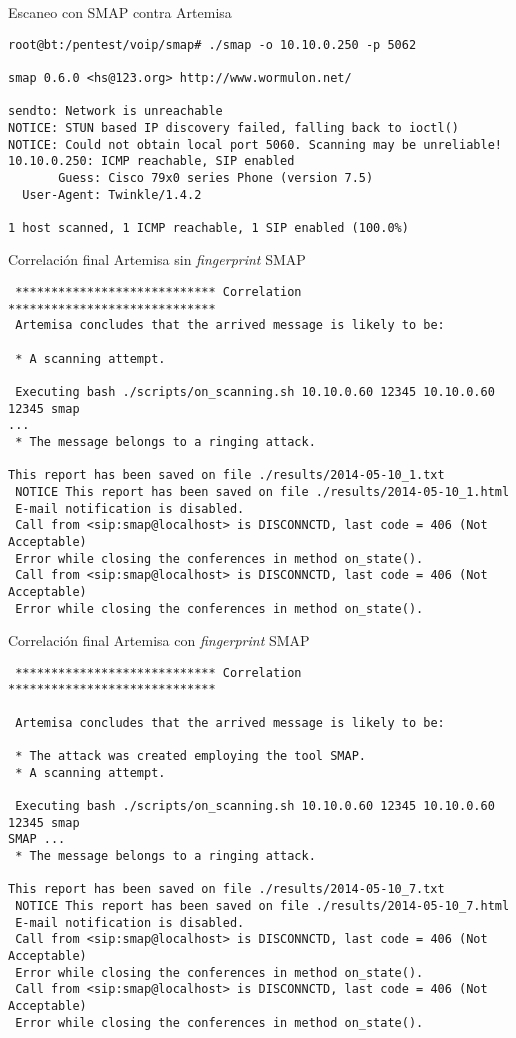 \documentclass[a4paper,12pt]{report}
\newenvironment{myscriptlisting}
{\begin{list}{}{\setlength{\leftmargin}{1em}}\item\scriptsize\bfseries}
{\end{list}}
\begin{document}
Escaneo con SMAP contra Artemisa
\begin{myscriptlisting}   
  \begin{verbatim}
root@bt:/pentest/voip/smap# ./smap -o 10.10.0.250 -p 5062

smap 0.6.0 <hs@123.org> http://www.wormulon.net/

sendto: Network is unreachable
NOTICE: STUN based IP discovery failed, falling back to ioctl()
NOTICE: Could not obtain local port 5060. Scanning may be unreliable!
10.10.0.250: ICMP reachable, SIP enabled
       Guess: Cisco 79x0 series Phone (version 7.5)
  User-Agent: Twinkle/1.4.2

1 host scanned, 1 ICMP reachable, 1 SIP enabled (100.0%)
  \end{verbatim}
\end{myscriptlisting}

Correlación final Artemisa sin \emph{fingerprint} SMAP
\begin{myscriptlisting}   
  \begin{verbatim}
 **************************** Correlation *****************************
 Artemisa concludes that the arrived message is likely to be:
 
 * A scanning attempt.
 
 Executing bash ./scripts/on_scanning.sh 10.10.0.60 12345 10.10.0.60 12345 smap 
...
 * The message belongs to a ringing attack.
 
This report has been saved on file ./results/2014-05-10_1.txt
 NOTICE This report has been saved on file ./results/2014-05-10_1.html
 E-mail notification is disabled.
 Call from <sip:smap@localhost> is DISCONNCTD, last code = 406 (Not Acceptable)
 Error while closing the conferences in method on_state().
 Call from <sip:smap@localhost> is DISCONNCTD, last code = 406 (Not Acceptable)
 Error while closing the conferences in method on_state().
  \end{verbatim}
\end{myscriptlisting}

Correlación final Artemisa con \emph{fingerprint} SMAP
\begin{myscriptlisting}   
  \begin{verbatim}
 **************************** Correlation *****************************

 Artemisa concludes that the arrived message is likely to be:
 
 * The attack was created employing the tool SMAP.
 * A scanning attempt.
 
 Executing bash ./scripts/on_scanning.sh 10.10.0.60 12345 10.10.0.60 12345 smap
SMAP ...
 * The message belongs to a ringing attack.
 
This report has been saved on file ./results/2014-05-10_7.txt
 NOTICE This report has been saved on file ./results/2014-05-10_7.html
 E-mail notification is disabled.
 Call from <sip:smap@localhost> is DISCONNCTD, last code = 406 (Not Acceptable)
 Error while closing the conferences in method on_state().
 Call from <sip:smap@localhost> is DISCONNCTD, last code = 406 (Not Acceptable)
 Error while closing the conferences in method on_state().
  \end{verbatim}
\end{myscriptlisting}
\end{document}
